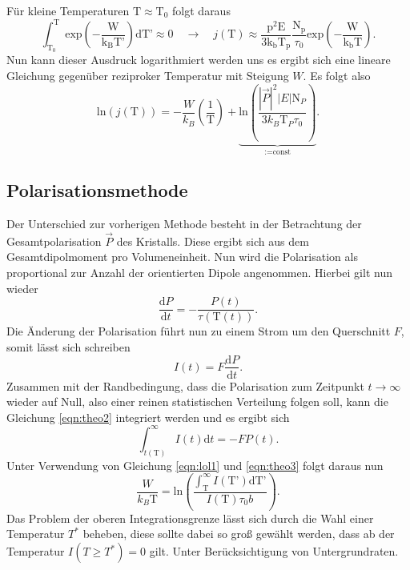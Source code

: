 Für kleine Temperaturen $\text{T} \approx \text{T}_0$ folgt daraus
\begin{equation}
    \label{eqn:theo5}
    \int^{\text{T}}_{\text{T}_0}  \text{exp} \left( - \frac{\text{W}}{\text{k}_{\text{B}}\text{T'}} \right) \text{dT'} \approx 0 \quad \to \quad j \left( \text{T} \right) \approx \frac{\text{p}^2 \text{E}}{3\text{k}_{\text{b}}\text{T}_{\text{p}}} \frac{\text{N}_{\text{p}}}{\tau_0} \text{exp} \left(-\frac{\text{W}}{\text{k}_{\text{b}}\text{T}} \right).
\end{equation}
Nun kann dieser Ausdruck logarithmiert werden uns es ergibt sich eine lineare Gleichung gegenüber reziproker Temperatur mit Steigung $W$. Es folgt also
\begin{equation}
    \label{eqn:theo6}
\text{ln}(j(\text{T})) = - \frac{W}{k_{B}} \left( \frac{1}{\text{T}}\right) + \underbrace{\text{ln}\left( \frac{|\vec{P}|^2 |E| \text{N}_P}{3 k_B \text{T}_P \tau_0}\right)}_{:= \text{const}}.
\end{equation}

\subsection{Polarisationsmethode}
\label{sec:pola}
Der Unterschied zur vorherigen Methode besteht in der Betrachtung der Gesamtpolarisation $\vec{P}$ des Kristalls. Diese ergibt sich aus dem Gesamtdipolmoment pro Volumeneinheit. Nun wird die Polarisation als 
proportional zur Anzahl der orientierten Dipole angenommen. Hierbei gilt nun wieder
\begin{equation}
    \label{eqn:theo3}
\frac{\text{d}P}{\text{d}t} = - \frac{P(t)}{\tau(\text{T}(t))}.
\end{equation}
Die Änderung der Polarisation führt nun zu einem Strom um den Querschnitt $F$, somit lässt sich schreiben
\begin{equation}
    \label{eqn:theo2}
I(t) = F \frac{\text{d}P}{\text{d}t}.
\end{equation}
Zusammen mit der Randbedingung, dass die Polarisation zum Zeitpunkt $t \to \infty$ wieder auf Null, also einer reinen statistischen Verteilung folgen soll, kann die Gleichung 
\eqref{eqn:theo2} integriert werden und es ergibt sich
\begin{equation}
\int_{t(\text{T})}^{\infty} I(t) \text{d}t = - F P(t).
\end{equation}
Unter Verwendung von Gleichung \eqref{eqn:lol1} und \eqref{eqn:theo3} folgt daraus nun
\begin{equation}
    \label{eqn:idkwhat}
\frac{W}{k_B \text{T}} = \text{ln} \left( \frac{\int_{\text{T}}^{\infty} I(\text{T'}) \text{dT'} }{I(\text{T}) \tau_0 b}\right).
\end{equation}
Das Problem der oberen Integrationsgrenze lässt sich durch die Wahl einer Temperatur $T^*$ beheben, diese sollte dabei so groß gewählt werden, dass ab der Temperatur $I(T \geq T^*) = 0$ gilt. Unter 
Berücksichtigung von Untergrundraten.

